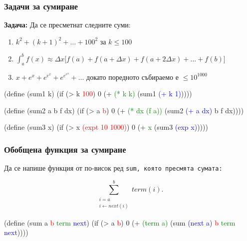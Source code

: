 \documentclass{beamer}
\begin{document}
\begin{frame}[fragile]
  \frametitle{Задачи за сумиране}

  \textbf{Задача:} Да се пресметнат следните суми:
  \begin{enumerate}
  \item $k^2 + (k+1)^2 + \ldots + 100^2$ за $k \leq 100$
  \item $\int_a^b f(x) \approx \Delta x\big[f(a) + f(a+\Delta x) + f(a+2\Delta x) + \ldots + f(b)\big]$
  \item $x + e^x + e^{e^x} + e^{e^{e^x}} + \ldots$ докато поредното събираемо е $\leq 10^{1000}$
  \end{enumerate}

  \pause

  \newcommand{\upper}{\textcolor<5->{red}}
  \newcommand{\term}{\textcolor<6->{green}}
  \newcommand{\next}{\textcolor<7->{blue}}

\begin{semiverbatim}
(define (sum1 k)
  (if (> k \upper{100}) 0 (+ \term{(* k k)} (sum1 \next{(+ k 1)}))))
\end{semiverbatim}

  \pause

\begin{semiverbatim}
(define (sum2 a b f dx)
  (if (> a \upper{b}) 0 (+ \term{(* dx (f a))} (sum2 \next{(+ a dx)} b f dx))))
\end{semiverbatim}

  \pause

\begin{semiverbatim}
(define (sum3 x)
  (if (> x \upper{(expt 10 1000)}) 0 (+ \term{x} (sum3 \next{(exp x)}))))
\end{semiverbatim}

\end{frame}

\begin{frame}[fragile]
  \frametitle{Обобщена функция за сумиране}
  Да се напише функция от по-висок ред \tt{sum}, която пресмята сумата:

  \begin{equation*}
    \sum_{\substack{i=a \\i \leftarrow next(i)}}^b term(i).
  \end{equation*}

\pause

\begin{semiverbatim}
(define (sum a \textcolor{red}b \textcolor{green}{term} \textcolor{blue}{next})
  (if (> a \textcolor{red}b) 0 (+ \textcolor{green}{(term a)} (sum \textcolor{blue}{(next a)} \textcolor{red}b \textcolor{green}{term} \textcolor{blue}{next}))))
\end{semiverbatim}
\end{frame}
\end{document}
